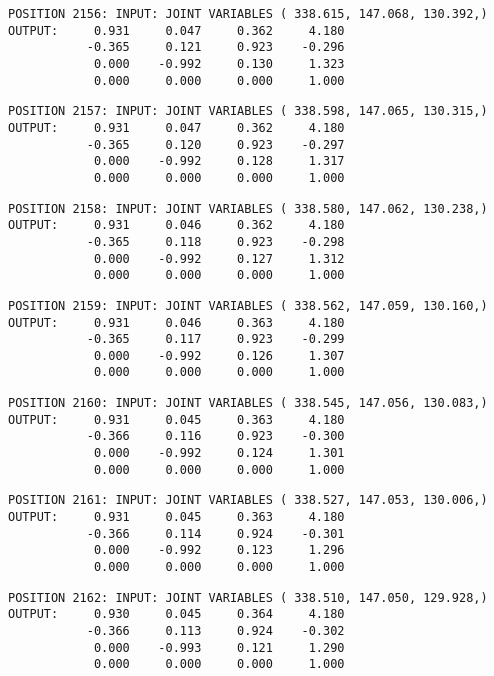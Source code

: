 \begin{verbatim}
POSITION 2156: INPUT: JOINT VARIABLES ( 338.615, 147.068, 130.392,)
OUTPUT:     0.931     0.047     0.362     4.180
           -0.365     0.121     0.923    -0.296
            0.000    -0.992     0.130     1.323
            0.000     0.000     0.000     1.000
\end{verbatim} \pagebreak[1]\begin{verbatim}
POSITION 2157: INPUT: JOINT VARIABLES ( 338.598, 147.065, 130.315,)
OUTPUT:     0.931     0.047     0.362     4.180
           -0.365     0.120     0.923    -0.297
            0.000    -0.992     0.128     1.317
            0.000     0.000     0.000     1.000
\end{verbatim} \pagebreak[1]\begin{verbatim}
POSITION 2158: INPUT: JOINT VARIABLES ( 338.580, 147.062, 130.238,)
OUTPUT:     0.931     0.046     0.362     4.180
           -0.365     0.118     0.923    -0.298
            0.000    -0.992     0.127     1.312
            0.000     0.000     0.000     1.000
\end{verbatim} \pagebreak[1]\begin{verbatim}
POSITION 2159: INPUT: JOINT VARIABLES ( 338.562, 147.059, 130.160,)
OUTPUT:     0.931     0.046     0.363     4.180
           -0.365     0.117     0.923    -0.299
            0.000    -0.992     0.126     1.307
            0.000     0.000     0.000     1.000
\end{verbatim} \pagebreak[1]\begin{verbatim}
POSITION 2160: INPUT: JOINT VARIABLES ( 338.545, 147.056, 130.083,)
OUTPUT:     0.931     0.045     0.363     4.180
           -0.366     0.116     0.923    -0.300
            0.000    -0.992     0.124     1.301
            0.000     0.000     0.000     1.000
\end{verbatim} \pagebreak[1]\begin{verbatim}
POSITION 2161: INPUT: JOINT VARIABLES ( 338.527, 147.053, 130.006,)
OUTPUT:     0.931     0.045     0.363     4.180
           -0.366     0.114     0.924    -0.301
            0.000    -0.992     0.123     1.296
            0.000     0.000     0.000     1.000
\end{verbatim} \pagebreak[1]\begin{verbatim}
POSITION 2162: INPUT: JOINT VARIABLES ( 338.510, 147.050, 129.928,)
OUTPUT:     0.930     0.045     0.364     4.180
           -0.366     0.113     0.924    -0.302
            0.000    -0.993     0.121     1.290
            0.000     0.000     0.000     1.000
\end{verbatim} \pagebreak[1]\begin{verbatim}

\end{verbatim}
